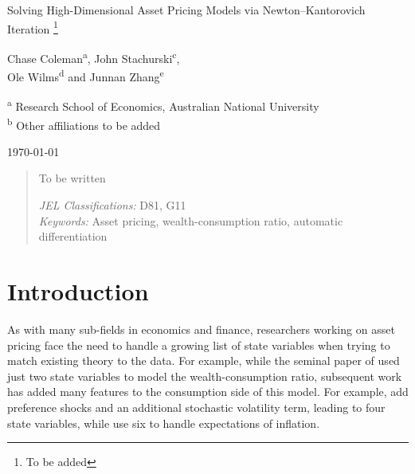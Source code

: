 \documentclass[12pt, reqno]{amsart}
\newcommand\blfootnote[1]{%
  \begingroup
  \renewcommand\thefootnote{}\footnote{#1}%
  \addtocounter{footnote}{-1}%
  \endgroup
}
\newcommand{\1}{\mathbbm 1}
\theoremstyle{plain}
\theoremstyle{definition}
\begin{document}
\title{}




\begin{center}
    \LARGE 
    Solving High-Dimensional Asset Pricing Models via Newton--Kantorovich
    Iteration
    \blfootnote{To be added}
 
    \vspace{1em}

    \large
    Chase Coleman\textsuperscript{a}, John Stachurski\textsuperscript{c}, \\ Ole
    Wilms\textsuperscript{d} and Junnan Zhang\textsuperscript{e} \par \bigskip

    \small
    \textsuperscript{a} Research School of Economics, Australian National University \\ 
    \textsuperscript{b} Other affiliations to be added  \\ \bigskip

    \normalsize
    \today
\end{center}


\begin{abstract}
    To be written
    \vspace{1em}

    \noindent
    \textit{JEL Classifications:} D81, G11 \\
    \textit{Keywords:} Asset pricing, wealth-consumption ratio, automatic differentiation
\end{abstract}





\maketitle


\section{Introduction}

As with many sub-fields in economics and finance, researchers working on asset
pricing face the need to handle a growing list of state variables when trying to
match existing theory to the data.  For example, while the seminal paper of
\cite{bansal2004risks} used just two state variables to model the
wealth-consumption ratio, subsequent work has added many features to the
consumption side of this model.  For example, \cite{schorfheide2018identifying}
add preference shocks and an additional stochastic volatility term, leading to
four state variables, while \cite{gomez2021important} use six to handle
expectations of inflation.  
\end{document}
